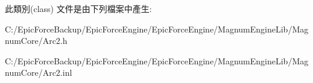 此類別(class) 文件是由下列檔案中產生\+:\begin{DoxyCompactItemize}
\item 
C\+:/\+Epic\+Force\+Backup/\+Epic\+Force\+Engine/\+Epic\+Force\+Engine/\+Magnum\+Engine\+Lib/\+Magnum\+Core/Arc2.\+h\item 
C\+:/\+Epic\+Force\+Backup/\+Epic\+Force\+Engine/\+Epic\+Force\+Engine/\+Magnum\+Engine\+Lib/\+Magnum\+Core/Arc2.\+inl\end{DoxyCompactItemize}
